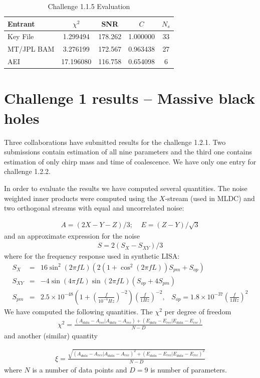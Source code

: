 \documentclass[11pt]{article}
\def\bea{\begin{eqnarray}}
\def\ena{\end{eqnarray}}
\begin{document}
\begin{table}[t]
\caption{\label{Challenge1.1.5}Challenge 1.1.5 Evaluation}
\begin{center}
\begin{tabular}{|l|c|c|c|c|}
\hline
Entrant  & $\chi^2$ & SNR & $C$ & $N_s$ \\
 \hline
Key File   &  1.299494 & 178.262 & 1.000000 & 33 \\
MT/JPL BAM &  3.276199 & 172.567 & 0.963438 & 27 \\
AEI        &  17.196080 & 116.758 & 0.654098 & 6 \\
\hline  
\end{tabular}
\end{center}
\end{table}

\section{Challenge 1 results -- Massive black holes}

Three collaborations have submitted results for the challenge 1.2.1. Two submissions contain estimation of all nine parameters and the third one contains estimation of only chirp mass and time of coalescence.  We have only one entry for challenge 1.2.2.

In order to evaluate the results we have computed several quantities.  The noise weighted inner products were computed using the $X$-stream (used in MLDC) and two orthogonal streams with equal and uncorrelated noise:

\bea
A = (2X - Y - Z)/3; \;\;\;\; E = (Z - Y)/\sqrt{3}
\ena
and an approximate expression for the noise \bea
S = 2(S_X - S_{XY})/3
\ena
where for the frequency response used in synthetic LISA:
\bea
S_X &=& 16 \sin^2(2\pi fL)  (2 (1 + \cos^2(2\pi fL)) S_{pm} + S_{op})\\
S_{XY} &=& -4 \sin(4\pi fL)\sin(2\pi fL)  ( S_{op} + 4S_{pm} )\\
S_{pm} &=& 2.5\times10^{-48} \left(1 + \left(\frac{f}{10^{-4}Hz}\right)^{-2}
\right)  \left(\frac{f}{1Hz}\right)^{-2},\;\;\;
S_{op} = 1.8\times 10^{-37}  \left(\frac{f}{1Hz}\right)^2
\ena
We have computed the following quantities. The $\chi^2$ per degree
of freedom
\bea
\chi^{2} = \frac{(A_{data}- A_{rec}|A_{data}- A_{rec}) + 
(E_{data} - E_{rec}|E_{data} - E_{rec})}
{N-D}
\ena
and another (similar) quantity

\bea
\xi = \frac{\sqrt{(A_{data}- A_{rec}|A_{data}- A_{rec})^2 + 
(E_{data} - E_{rec}|E_{data} - E_{rec})^2}}
{N-D}
\ena
where $N$ is a number of data points and $D=9$ is number of parameters.
\end{document}
